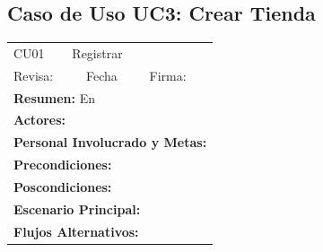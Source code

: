 \subsection{Caso de Uso UC3: Crear Tienda}

\begin{longtable}{|l|p{5.5cm}|l|p{2cm}|l|p{1.9cm}|} \hline
    \cellcolor{grisOscuro} CU01 & \multicolumn{4}{|l|}{  \cellcolor{grisOscuro} Registrar} &  \cellcolor{grisClaro}\multirow{2}{1cm}{} \\ \cline{1-5}
    \cellcolor{grisOscuro} Revisa: &  \cellcolor{grisClaro} &  \cellcolor{grisOscuro} Fecha &  \cellcolor{grisClaro} &  \cellcolor{grisOscuro} Firma: & \cellcolor{grisClaro} \\ \hline
    \multicolumn{6}{|p{15cm}|}{ \textbf{Resumen: } En

    } \\ \hline

    \multicolumn{6}{|p{15cm}|}{ \textbf{Actores: }

    } \\ \hline

    \multicolumn{6}{|p{15cm}|}{ \textbf{Personal Involucrado y Metas: }

    } \\ \hline

    \multicolumn{6}{|p{15cm}|}{ \textbf{Precondiciones: }

    } \\ \hline

    \multicolumn{6}{|p{15cm}|}{ \textbf{Poscondiciones: }

    } \\ \hline

    \multicolumn{6}{|p{15cm}|}{ \textbf{Escenario Principal: }

    } \\ \hline

    \multicolumn{6}{|p{15cm}|}{ \textbf{Flujos Alternativos: }

    } \\ \hline

\end{longtable}

